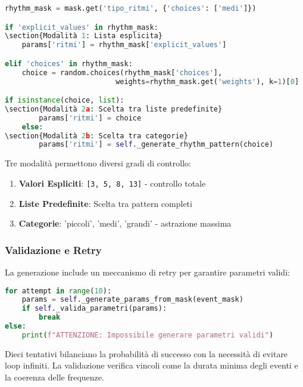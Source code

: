 \begin{lstlisting}[language=Python]
rhythm_mask = mask.get('tipo_ritmi', {'choices': ['medi']})

if 'explicit_values' in rhythm_mask:
\section{Modalità 1: Lista esplicita}
    params['ritmi'] = rhythm_mask['explicit_values']

elif 'choices' in rhythm_mask:
    choice = random.choices(rhythm_mask['choices'], 
                          weights=rhythm_mask.get('weights'), k=1)[0]

if isinstance(choice, list):
\section{Modalità 2a: Scelta tra liste predefinite}
        params['ritmi'] = choice
    else:
\section{Modalità 2b: Scelta tra categorie}
        params['ritmi'] = self._generate_rhythm_pattern(choice)
\end{lstlisting}

Tre modalità permettono diversi gradi di controllo:
\begin{enumerate}
    \item \textbf{Valori Espliciti}: \texttt{[3, 5, 8, 13]} - controllo totale
    \item \textbf{Liste Predefinite}: Scelta tra pattern completi
    \item \textbf{Categorie}: 'piccoli', 'medi', 'grandi' - astrazione massima
\end{enumerate}
\subsubsection{Validazione e Retry}
La generazione include un meccanismo di retry per garantire parametri validi:

\begin{lstlisting}[language=Python]
for attempt in range(10):
    params = self._generate_params_from_mask(event_mask)
    if self._valida_parametri(params):
        break
else:
    print(f"ATTENZIONE: Impossibile generare parametri validi")
\end{lstlisting}

Dieci tentativi bilanciano la probabilità di successo con la necessità di evitare loop infiniti. La validazione verifica vincoli come la durata minima degli eventi e la coerenza delle frequenze.
